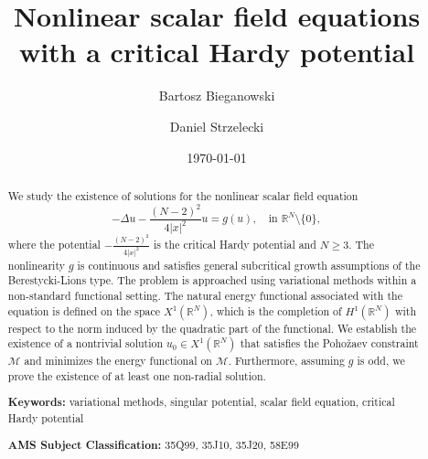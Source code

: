 \documentclass[12pt,leqno,twoside,sort]{amsart}
\newcommand{\R}{\mathbb{R}}
\newcommand{\cM}{{\mathcal M}}
\numberwithin{equation}{section}
\begin{document}
\title[Nonlinear scalar field equations with a critical Hardy potential]{Nonlinear scalar field equations with a critical Hardy potential}

\author[B. Bieganowski]{Bartosz Bieganowski}
\author[D. Strzelecki]{Daniel Strzelecki}

\address[B. Bieganowski]{\newline\indent
	Faculty of Mathematics, Informatics and Mechanics, \newline\indent
	University of Warsaw, \newline\indent
	ul. Banacha 2, 02-097 Warsaw, Poland}

\address[D. Strzelecki]{\newline\indent
	Faculty of Mathematics, Informatics and Mechanics, \newline\indent
	University of Warsaw, \newline\indent
	ul. Banacha 2, 02-097 Warsaw, Poland}

\date{}	\date{\today} 

\begin{abstract} 
We study the existence of solutions for the nonlinear scalar field equation
$$-\Delta u - \frac{(N-2)^2}{4|x|^2} u  = g(u),  \quad \mbox{in } \R^N \setminus \{0\},$$
where the potential $-\frac{(N-2)^2}{4|x|^2}$ is the critical Hardy potential and $N \geq 3$. The nonlinearity $g$ is continuous and satisfies general subcritical growth assumptions of the Berestycki-Lions type. The problem is approached using variational methods within a non-standard functional setting. The natural energy functional associated with the equation is defined on the space $X^1(\R^N)$, which is the completion of $H^1(\R^N)$ with respect to the norm induced by the quadratic part of the functional. We establish the existence of a nontrivial solution $u_0 \in X^1(\R^N)$ that satisfies the Poho\v{z}aev constraint $\cM$ and minimizes the energy functional on $\cM$. Furthermore, assuming $g$ is odd, we prove the existence of at least one non-radial solution.

\medskip

\noindent \textbf{Keywords:} variational methods, singular potential, scalar field equation, critical Hardy potential
   
\noindent \textbf{AMS Subject Classification:} 35Q99, 35J10, 35J20, 58E99
\end{abstract}
\end{document}
